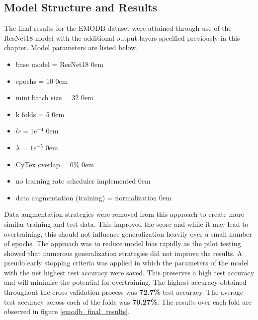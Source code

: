 \subsection{Model Structure and Results}
The final results for the EMODB dataset were attained through use of the ResNet18 model with the additional output layers specified previously in this chapter. Model parameters are listed below. 
\begin{itemize}
    \item base model = ResNet18
    \itemsep0em
    \item epochs = 10
    \itemsep0em
    \item mini batch size = 32
    \itemsep0em
    \item k folds = 5
    \itemsep0em
    \item $lr = 1e^{-4}$
    \itemsep0em
    \item $\lambda$ = $1e^{-5}$
    \itemsep0em
    \item CyTex overlap = $0\%$
    \itemsep0em
    \item no learning rate scheduler implemented
    \itemsep0em
    \item data augmentation (training) = normalization
    \itemsep0em
\end{itemize}
Data augmentation strategies were removed from this approach to create more similar training and test data. This improved the score and while it may lead to overtraining, this should not influence generalization heavily over a small number of epochs. The approach was to reduce model bias rapidly as the pilot testing showed that numerous generalization strategies did not improve the results. A pseudo early stopping criteria was applied in which the parameters of the model with the net highest test accuracy were saved. This preserves a high test accuracy and will minimise the potential for overtraining. The highest accuracy obtained throughout the cross validation process was \textbf{72.7\%} test accuracy. The average test accuracy across each of the folds was \textbf{70.27\%}. The results over each fold are observed in figure \ref{emodb_final_results}.

